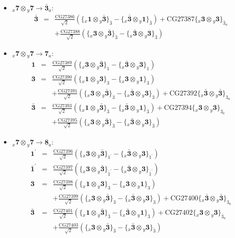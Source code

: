 \documentclass[english]{article}
\newcommand{\rep}[1]{\mathbf{#1}}
\newcommand{\repx}[2]{{}_{#2}\mathbf{#1}}
\newcommand{\subcg}[3]{\big\{ \repx{#1}{x}\otimes\repx{#2}{y}\big\}^{}_{#3}}
\begin{document}
\begin{itemize}
\begin{eqnarray*}
\end{eqnarray*}
\item $\repx{7}{x}\otimes\repx{7}{y}\to\rep{\bar{3}}_{a}$:
\begin{eqnarray*}
\rep{\bar{3}} &=& \frac{\text{CG27386}}{\sqrt{2}}\left(\subcg{1}{\bar{3}}{\bar{3}}-\subcg{\bar{3}}{1}{\bar{3}}\right)+\text{CG27387}\subcg{3}{3}{\bar{3}_{a}} \\ 
 & & +\frac{\text{CG27388}}{\sqrt{2}}\left(\subcg{3}{\bar{3}}{\bar{3}}-\subcg{\bar{3}}{3}{\bar{3}}\right)
\end{eqnarray*}
\item $\repx{7}{x}\otimes\repx{7}{y}\to\rep{7}_{a}$:
\begin{eqnarray*}
\rep{1} &=& \frac{\text{CG27389}}{\sqrt{2}}\left(\subcg{3}{\bar{3}}{1}-\subcg{\bar{3}}{3}{1}\right)
\\
\rep{3} &=& \frac{\text{CG27390}}{\sqrt{2}}\left(\subcg{1}{3}{3}-\subcg{3}{1}{3}\right) \\ 
 & & +\frac{\text{CG27391}}{\sqrt{2}}\left(\subcg{3}{\bar{3}}{3}-\subcg{\bar{3}}{3}{3}\right)+\text{CG27392}\subcg{\bar{3}}{\bar{3}}{3_{a}}
\\
\rep{\bar{3}} &=& \frac{\text{CG27393}}{\sqrt{2}}\left(\subcg{1}{\bar{3}}{\bar{3}}-\subcg{\bar{3}}{1}{\bar{3}}\right)+\text{CG27394}\subcg{3}{3}{\bar{3}_{a}} \\ 
 & & +\frac{\text{CG27395}}{\sqrt{2}}\left(\subcg{3}{\bar{3}}{\bar{3}}-\subcg{\bar{3}}{3}{\bar{3}}\right)
\end{eqnarray*}
\item $\repx{7}{x}\otimes\repx{7}{y}\to\rep{8}_{a}$:
\begin{eqnarray*}
\rep{1^{\prime}} &=& \frac{\text{CG27396}}{\sqrt{2}}\left(\subcg{3}{\bar{3}}{1^{\prime}}-\subcg{\bar{3}}{3}{1^{\prime}}\right)
\\
\rep{\bar{1}^{\prime}} &=& \frac{\text{CG27397}}{\sqrt{2}}\left(\subcg{3}{\bar{3}}{\bar{1}^{\prime}}-\subcg{\bar{3}}{3}{\bar{1}^{\prime}}\right)
\\
\rep{3} &=& \frac{\text{CG27398}}{\sqrt{2}}\left(\subcg{1}{3}{3}-\subcg{3}{1}{3}\right) \\ 
 & & +\frac{\text{CG27399}}{\sqrt{2}}\left(\subcg{3}{\bar{3}}{3}-\subcg{\bar{3}}{3}{3}\right)+\text{CG27400}\subcg{\bar{3}}{\bar{3}}{3_{a}}
\\
\rep{\bar{3}} &=& \frac{\text{CG27401}}{\sqrt{2}}\left(\subcg{1}{\bar{3}}{\bar{3}}-\subcg{\bar{3}}{1}{\bar{3}}\right)+\text{CG27402}\subcg{3}{3}{\bar{3}_{a}} \\ 
 & & +\frac{\text{CG27403}}{\sqrt{2}}\left(\subcg{3}{\bar{3}}{\bar{3}}-\subcg{\bar{3}}{3}{\bar{3}}\right)
\end{eqnarray*}
\end{itemize}
\end{document}
